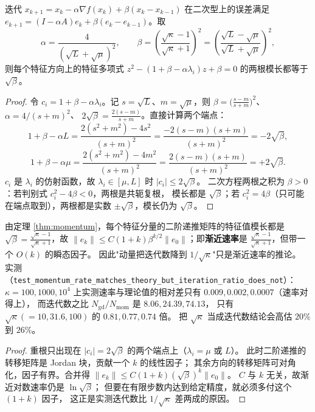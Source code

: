 \begin{theorem}[重球动量的谱半径]
\label{thm:momentum}
迭代 $x_{k+1}=x_k-\alpha\nabla f(x_k)+\beta(x_k-x_{k-1})$ 在二次型上的误差满足
$e_{k+1}=(I-\alpha A)e_k+\beta(e_k-e_{k-1})$。取
\[
  \alpha=\frac{4}{(\sqrt L+\sqrt\mu)^2},\qquad
  \beta=\left(\frac{\sqrt\kappa-1}{\sqrt\kappa+1}\right)^2
  =\left(\frac{\sqrt L-\sqrt\mu}{\sqrt L+\sqrt\mu}\right)^2 ,
\]
则每个特征方向上的特征多项式
$z^2-(1+\beta-\alpha\lambda_i)z+\beta=0$ 的两根模长都等于 $\sqrt\beta$。
\end{theorem}

\begin{proof}
令 $c_i=1+\beta-\alpha\lambda_i$。记 $s=\sqrt L$、$m=\sqrt\mu$，则
$\beta=\bigl(\frac{s-m}{s+m}\bigr)^2$、$\alpha=4/(s+m)^2$、
$2\sqrt\beta=\frac{2(s-m)}{s+m}$。直接计算两个端点：
\[
  1+\beta-\alpha L=\frac{2(s^2+m^2)-4s^2}{(s+m)^2}
  =\frac{-2(s-m)(s+m)}{(s+m)^2}=-2\sqrt\beta,
\]
\[
  1+\beta-\alpha\mu=\frac{2(s^2+m^2)-4m^2}{(s+m)^2}
  =\frac{2(s-m)(s+m)}{(s+m)^2}=+2\sqrt\beta .
\]
$c_i$ 是 $\lambda_i$ 的仿射函数，故 $\lambda_i\in[\mu,L]$ 时
$|c_i|\le2\sqrt\beta$。
二次方程两根之积为 $\beta>0$：若判别式 $c_i^2-4\beta<0$，两根是共轭复根，
模长都是 $\sqrt\beta$；若 $c_i^2=4\beta$（只可能在端点取到），两根都是实数
$\pm\sqrt\beta$，模长仍为 $\sqrt\beta$。
\end{proof}

\begin{corollary}
\label{cor:momentum-transient}
由定理 \ref{thm:momentum}，每个特征分量的二阶递推矩阵的特征值模长都是
$\sqrt\beta=\frac{\sqrt\kappa-1}{\sqrt\kappa+1}$，故
$\|e_k\|\le C(1+k)\beta^{k/2}\|e_0\|$；即\textbf{渐近速率}是
$\frac{\sqrt\kappa-1}{\sqrt\kappa+1}$，但带一个 $O(k)$ 的瞬态因子。
因此"动量把迭代数降到 $1/\sqrt\kappa$"只是渐近速率的推论。
实测（\texttt{test\_momentum\_rate\_matches\_theory\_but\_iteration\_ratio\_does\_not}）：
$\kappa=100,1000,10^4$ 上实测速率与理论值的相对差只有 $0.009,0.002,0.0007$（速率对得上），
而迭代数之比 $N_{\text{gd}}/N_{\text{mom}}$ 是 $8.06,24.39,74.13$，
只有 $\sqrt\kappa(=10,31.6,100)$ 的 $0.81,0.77,0.74$ 倍。
把 $\sqrt\kappa$ 当成迭代数结论会高估 $20\%$ 到 $26\%$。
\end{corollary}

\begin{proof}
重根只出现在 $|c_i|=2\sqrt\beta$ 的两个端点上（$\lambda_i=\mu$ 或 $L$）。
此时二阶递推的转移矩阵是 Jordan 块，贡献一个 $k$ 的线性因子；
其余方向的转移矩阵可对角化，因子有界。合并得
$\|e_k\|\le C(1+k)(\sqrt\beta)^k\|e_0\|$。
$C$ 与 $k$ 无关，故渐近对数速率仍是 $\ln\sqrt\beta$；
但要在有限步数内达到给定精度，就必须多付这个 $(1+k)$ 因子，
这正是实测迭代数比 $1/\sqrt\kappa$ 差两成的原因。
\end{proof}

